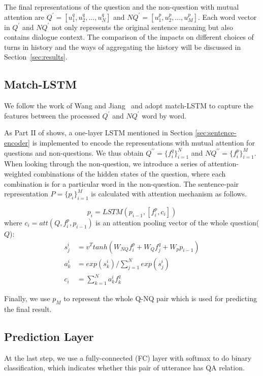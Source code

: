 The final representations of the question and the non-question with
mutual attention are $Q^\prime=[u^q_1,u^q_2,...,u^q_N]$ and 
$NQ^\prime=[u^p_1,u^p_2,...,u^p_M]$. Each word vector
in $Q^\prime$ and $NQ^\prime$ not only represents the original sentence meaning 
but also contains dialogue context. The comparison of the impacts on 
different choices of turns in history and the ways of aggregating the 
history will be discussed in Section~\ref{sec:results}.


\subsection{Match-LSTM}
We follow the work of Wang and Jiang~ 
and adopt match-LSTM to capture the features between the 
processed $Q^\prime$ and $NQ^\prime$ word by word.

As Part II of  shows,
a one-layer LSTM mentioned in Section \ref{sec:sentence-encoder} is 
implemented to encode the representations with mutual attention for 
questions and non-questions. 
We thus obtain $Q^{\prime\prime}=\{f^q_i\}_{i=1}^{N}$ and $NQ^{\prime\prime}=\{f^p_i\}_{i=1}^{M}$. When looking through the non-question, we introduce a series of attention-weighted combinations of the hidden states of the question, where each combination is for a particular word in the non-question. The sentence-pair representation $P=\{p_i\}_{i=1}^{M}$ is calculated with attention mechanism as follows. 

\begin{equation}
    p_i=LSTM(p_{i-1},[f^p_i,c_i])
\end{equation}
where $c_i=att(Q,f^p_i,p_{i-1})$ is an attention pooling vector of the whole question($Q$):
\begin{equation}
\begin{aligned}
s^i_j&=v^Ttanh(W_{NQ}f^p_i+W_Qf^q_j+W_pp_{i-1})\\
a^i_k&=exp(s^i_k)/\sum_{j=1}^Nexp(s^i_j)\\
c_i&=\sum_{k=1}^Na^i_kf^q_k
\end{aligned}
\end{equation}

Finally, we use $p_M$ to represent the whole Q-NQ pair which is used for predicting the final result.

\subsection{Prediction Layer }
At the last step, we use a fully-connected (FC) layer with softmax to do binary classification, which indicates whether this pair of utterance has QA relation.

